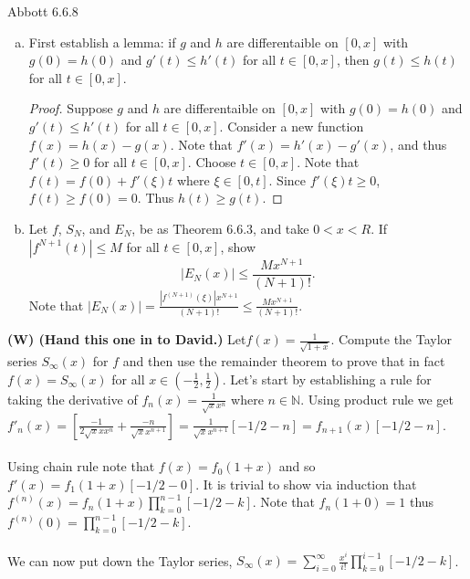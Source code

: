 \documentclass[12pt]{article}
\makeatletter
\theoremstyle{homework}
\newenvironment{exercise}[1]
{\def\@currentlabel{#1}\exercisecore}
{\endexercisecore}
\newcommand\W{{\color{red}\textbf{(W) (Hand this one in to David.)}}}
\makeatother
\begin{document}
\begin{exercise}
8
Abbott 6.6.8
\end{exercise}
\begin{enumerate}[(a)] 
\item First establish a lemma: if $g$ and $h$ are differentaible on $[0,x]$ with $g(0)=h(0)$ and $g'(t) \le h'(t)$ for all $t \in [0,x]$, then $g(t) \le h(t)$ for all $t \in [0,x]$.\\
\begin{proof}
Suppose $g$ and $h$ are differentaible on $[0,x]$ with $g(0)=h(0)$ and $g'(t) \le h'(t)$ for all $t \in [0,x]$.  Consider a new function $f(x)=h(x)-g(x)$.  Note that $f'(x)=h'(x)-g'(x)$, and thus $f'(t)\geq 0$ for all $t\in [0,x]$.  Choose $t\in [0,x]$.  Note that $f(t)=f(0)+f'(\xi)t$ where $\xi\in[0,t]$.  Since $f'(\xi)t\geq 0$, $f(t)\geq f(0)=0$.  Thus $h(t)\geq g(t)$.
\end{proof}
\item Let $f$, $S_N$, and $E_N$, be as Theorem 6.6.3, and take $0 < x < R$. If $|f^{N+1}(t)|\le M$ for all $t \in [0,x]$, show $$|E_N(x)|\le \frac{Mx^{N+1}}{(N+1)!}.$$
Note that $|E_N(x)|=\frac{|f^{(N+1)}(\xi)|x^{N+1}}{(N+1)!}\leq \frac{Mx^{N+1}}{(N+1)!}$.
\end{enumerate}
\newpage
\W
\begin{exercise}
9
Let$f(x)=\frac{1}{\sqrt{1+x}}$. Compute the Taylor series $S_\infty(x)$ for $f$ and then use the remainder theorem to prove that in fact $f(x) = S_\infty(x)$ for all $x\in (-\frac{1}{2},\frac{1}{2})$.
\end{exercise}
Let's start by establishing a rule for taking the derivative of $f_n(x)=\frac{1}{\sqrt{x}x^n}$ where $n\in\mathbb{N}$.  Using product rule we get $f'_n(x)=[\frac{-1}{2\sqrt{x}xx^n}+\frac{-n}{\sqrt{x}x^{n+1}}]=\frac{1}{\sqrt{x}x^{n+1}}[-1/2-n]=f_{n+1}(x)[-1/2-n]$.\\\\
Using chain rule note that $f(x)=f_0(1+x)$ and so $f'(x)=f_1(1+x)[-1/2-0]$.  It is trivial to show via induction that $f^{(n)}(x)=f_n(1+x)\prod_{k=0}^{n-1} [-1/2-k]$.  Note that $f_n(1+0)=1$ thus $f^{(n)}(0)=\prod_{k=0}^{n-1} [-1/2-k]$.\\\\
We can now put down the Taylor series, $S_\infty(x)=\sum_{i=0}^\infty \frac{x^i}{i!} \prod_{k=0}^{i-1} [-1/2-k]$.\\\\
\end{document}
